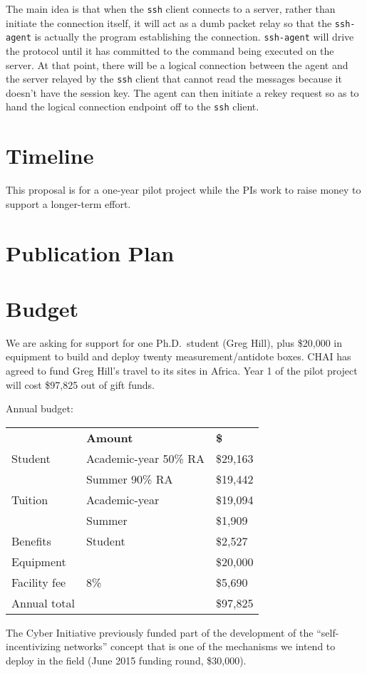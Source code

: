 \documentclass[11pt]{article}
\newcommand{\slim}{\vspace{\baselineskip}}
\begin{document}
The main idea is that when the \texttt{ssh} client connects to a
server, rather than initiate the connection itself, it will act as a
dumb packet relay so that the \texttt{ssh-agent} is actually the
program establishing the connection.  \texttt{ssh-agent} will drive
the protocol until it has committed to the command being executed on
the server.  At that point, there will be a logical connection between
the agent and the server relayed by the \texttt{ssh} client that
cannot read the messages because it doesn't have the session key.  The
agent can then initiate a rekey request so as to hand the logical
connection endpoint off to the \texttt{ssh} client.

\section{Timeline}

This proposal is for a one-year pilot project while the PIs work to
raise money to support a longer-term effort.

\section{Publication Plan}

\section{Budget}

We are asking for support for one Ph.D.~student (Greg Hill), plus
\$20,000 in equipment to build and deploy twenty measurement/antidote
boxes. CHAI has agreed to fund Greg Hill's travel to its sites in
Africa. Year 1 of the pilot project will cost \$97,825 out of gift
funds.

\slim

\noindent Annual budget:

\slim

\noindent \begin{tabular}{ll|l}
& \bf Amount & \bf \$ \\
Student & Academic-year 50\% RA & \$29,163 \\
        & Summer 90\% RA & \$19,442 \\

Tuition & Academic-year & \$19,094 \\
        & Summer        & \$1,909 \\

Benefits & Student & \$2,527 \\

Equipment &         & \$20,000 \\

\hline

Facility fee & 8\% & \$5,690 \\
Annual total & & \$97,825 \\

\end{tabular}

\slim

The Cyber Initiative previously funded part of the development of the
``self-incentivizing networks'' concept that is one of the mechanisms
we intend to deploy in the field (June 2015 funding round, \$30,000).

{\footnotesize



}
\end{document}
